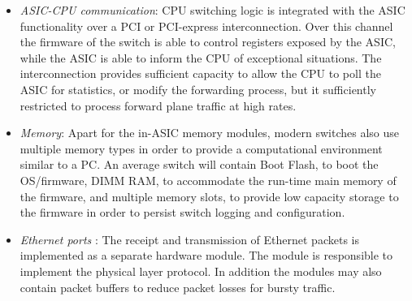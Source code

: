 \begin{itemize}
        TOR-type switches can handle
        line-rate non-blocking traffic for a few ports, using a
        single ASIC silicon.  Current ASIC contain four important modules.
        Firstly, the chip requires an {\it arbiter} module to multiplex and
        synchronize packet propagation from the Ethernet ports to the main
        processing pipeline of the silicon. The arbiter ensures non-preemptive
        packet processing, by bridging the rate mismatch between the 
        silicon clock and the transmission rate of the link. 
        In the main
        processing pipeline the ASIC requires a {\it protocol parsing} module and
        a {\it lookup module}. The protocol parser, extracts required packet
        fields, which are used later by the lookup module to define required
        packet processing.
        The lookup module relies on an interface with an external memory module
        in order to match protocol fields with policy packet processing.
        Memory modules have a trade-off between cost and access speed and a
        low-cost design principle can make the design extremely complex.
        \footnote{CAM/TCAM lookup: < 10 clock
          cycles, SRAM: 2-3 nsec, DRAM: 20-35
          nsec,~\url{http://people.ee.duke.edu/~sorin/prior-courses/ece152-spring2009/lectures/6.2.2-memory.pdf}}.
        Finally, the output arbiter is responsible to perform the required
        modifications to the packet and forward it to the appropriate output
        queue. Apart for the mentioned modules, a silicon can have additional
        processing modules to enable extended functionality such as access
        control list (ACL), flow statistics monitoring etc.
  \item \emph{ASIC-CPU communication}: CPU switching logic is integrated with
        the ASIC functionality over a PCI or PCI-express interconnection. Over
        this channel the firmware of the switch is able to control registers
        exposed by the ASIC, while the ASIC is able to inform the CPU of
        exceptional situations. The interconnection provides sufficient capacity
        to allow the CPU to poll the ASIC for statistics, or modify the
        forwarding process, but it sufficiently restricted to process forward
        plane traffic at high rates.
  \item \emph{Memory}: Apart for the in-ASIC memory modules, modern switches
        also use multiple memory types in order to provide a computational
        environment similar to a PC. An average switch will contain Boot Flash,
        to boot the OS/firmware, DIMM RAM, to accommodate the run-time main
        memory of the firmware, and multiple memory slots, to provide low
        capacity storage to the firmware in order to persist switch logging and
        configuration.
  \item \emph{Ethernet ports} : The receipt and transmission of Ethernet packets
        is implemented as a separate hardware module. The module is responsible
        to implement the physical layer protocol. In addition the modules may
        also contain packet buffers to reduce packet losses for bursty traffic.  
    
\end{itemize}

